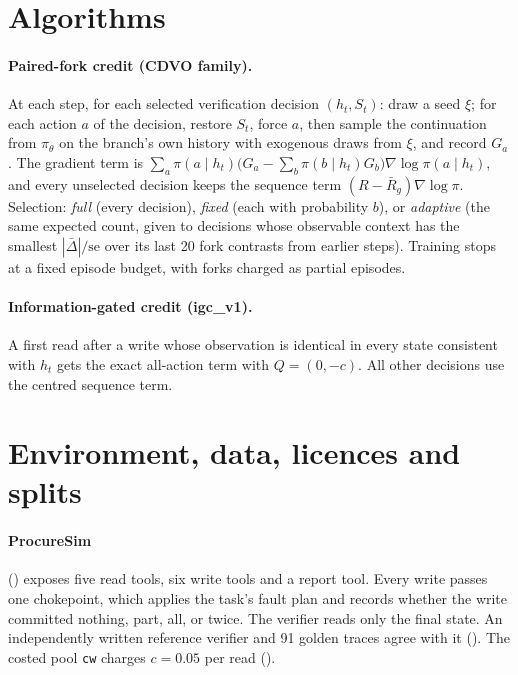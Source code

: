 \section{Algorithms}\label{app2:alg}

\paragraph{Paired-fork credit (CDVO family).} At each step, for each selected verification decision $(h_t,S_t)$:
draw a seed $\xi$; for each action $a$ of the decision, restore $S_t$, force $a$, then sample the continuation from
$\pi_\theta$ on the branch's own history with exogenous draws from $\xi$, and record $G_a$. The gradient term is
$\sum_a\pi(a\mid h_t)\big(G_a-\sum_b\pi(b\mid h_t)G_b\big)\nabla\log\pi(a\mid h_t)$, and every unselected decision keeps the
sequence term $(R-\bar R_g)\nabla\log\pi$. Selection: \emph{full} (every decision), \emph{fixed} (each with
probability $b$), or \emph{adaptive} (the same expected count, given to decisions whose observable context has the
smallest $|\bar\Delta|/\mathrm{se}$ over its last 20 fork contrasts from earlier steps). Training stops at a fixed
episode budget, with forks charged as partial episodes.

\paragraph{Information-gated credit (igc\_v1).} A first read after a write whose observation is identical in every
state consistent with $h_t$ gets the exact all-action term with $Q=(0,-c)$. All other decisions use the centred
sequence term.

\section{Environment, data, licences and splits}\label{app2:data}

\paragraph{ProcureSim}\label{app2:env} () exposes five read tools, six write tools
and a report tool. Every write passes one chokepoint, which applies the task's fault plan and records whether the
write committed nothing, part, all, or twice. The verifier reads only the final state. An independently written
reference verifier and 91 golden traces agree with it (). The costed pool \texttt{cw}
charges $c=0.05$ per read ().

